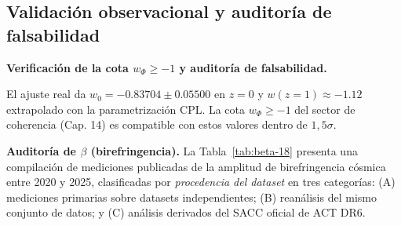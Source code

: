 ﻿\documentclass[11pt,letterpaper]{article}
\begin{document}
\subsection{Validación observacional y auditoría de falsabilidad}
\textbf{Verificación de la cota $w_\Phi \geq -1$ y auditoría de falsabilidad.}

El ajuste real da $w_0 = -0.83704 \pm 0.05500$ en $z=0$ y
$w(z=1) \approx -1.12$ extrapolado con la parametrización CPL. La
cota $w_\Phi \geq -1$ del sector de coherencia (Cap. 14) es
compatible con estos valores dentro de $1{,}5\sigma$.

\textbf{Auditoría de $\beta$ (birefringencia).} La Tabla~\ref{tab:beta-18}
presenta una compilación de mediciones publicadas de la amplitud de
birefringencia cósmica entre 2020 y 2025, clasificadas por \emph{procedencia
del dataset} en tres categorías: (A) mediciones primarias sobre datasets
independientes; (B) reanálisis del mismo conjunto de datos; y (C) análisis
derivados del SACC oficial de ACT DR6.

\begin{table}[htbp]
  \centering
  \small
  \caption{Mediciones de birefringencia cósmica clasificadas por procedencia
  del dataset. Las filas de categoría B reutilizan datos ya contabilizados
  en categoría A; no son observaciones independientes entre sí. $^\ast$Scott~2025
  reporta adicionalmente $\pm 0{,}28^\circ$ sistemático no incluido aquí.}
  \label{tab:beta-18}
\end{table}
\end{document}
